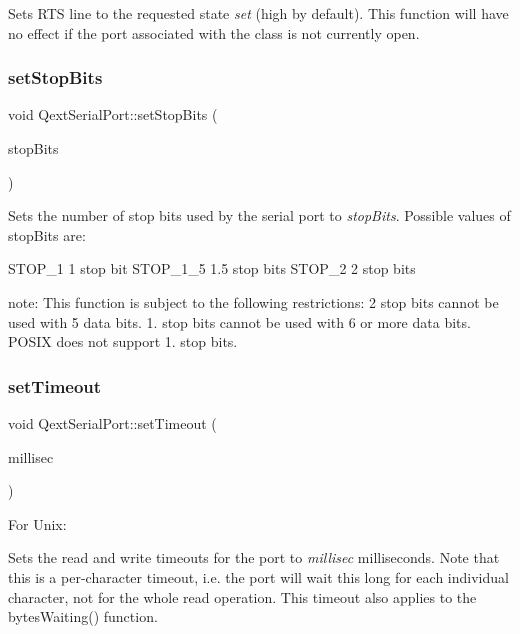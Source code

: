 Sets R\+TS line to the requested state {\itshape set} (high by default). This function will have no effect if the port associated with the class is not currently open. \mbox{\label{classQextSerialPort_a2ad017cb814115af9d63a9cfa2a4e171}} 
\subsubsection{\texorpdfstring{set\+Stop\+Bits}{setStopBits}}
{\footnotesize\ttfamily void Qext\+Serial\+Port\+::set\+Stop\+Bits (\begin{DoxyParamCaption}\item[{Stop\+Bits\+Type}]{stop\+Bits }\end{DoxyParamCaption})\hspace{0.3cm}{\ttfamily [slot]}}

Sets the number of stop bits used by the serial port to {\itshape stop\+Bits}. Possible values of stop\+Bits are\+: 
\begin{DoxyCode}
STOP\_1      1 stop bit
STOP\_1\_5    1.5 stop bits
STOP\_2      2 stop bits
\end{DoxyCode}


note\+: This function is subject to the following restrictions\+:   2 stop bits cannot be used with 5 data bits.  1. stop bits cannot be used with 6 or more data bits.  P\+O\+S\+IX does not support 1. stop bits.  \mbox{\label{classQextSerialPort_a7a0f74ee86b1b38fc2a42243a7aea87d}} 
\subsubsection{\texorpdfstring{set\+Timeout}{setTimeout}}
{\footnotesize\ttfamily void Qext\+Serial\+Port\+::set\+Timeout (\begin{DoxyParamCaption}\item[{long}]{millisec }\end{DoxyParamCaption})\hspace{0.3cm}{\ttfamily [slot]}}

For Unix\+:

Sets the read and write timeouts for the port to {\itshape millisec} milliseconds. Note that this is a per-\/character timeout, i.\+e. the port will wait this long for each individual character, not for the whole read operation. This timeout also applies to the bytes\+Waiting() function.

